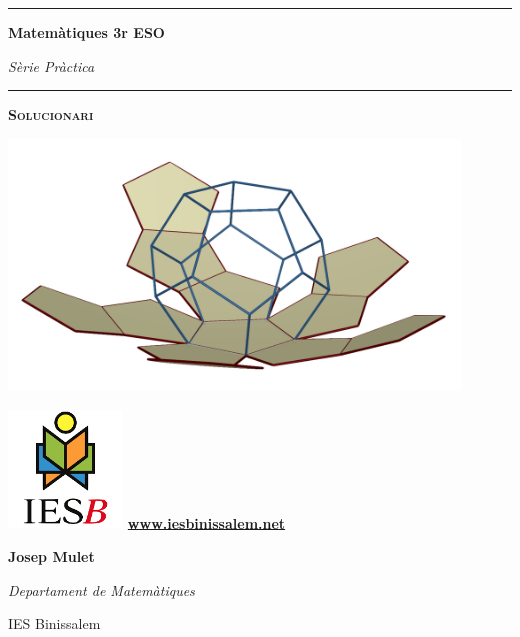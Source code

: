 \documentclass[a4paper, pdf, twoside]{book}
\begin{document}
\thispagestyle{empty}
\pagestyle{plain}
\renewcommand{\headrulewidth}{0pt}
\begin{center}
\vspace*{0.5cm}\hrule\vspace{0.5cm}
\Huge \textbf{Matemàtiques 3r ESO} \par
\large \textit{Sèrie Pràctica}\par
\vspace{0.5cm}\hrule\vspace{0.5cm}
\Huge \textbf{\textsc{Solucionari}} \par \vspace{1.5cm}
	\includegraphics[width=0.9\textwidth]{img-00/portada}   

	\vspace{1.5cm}  
	\begin{minipage}{0.4\textwidth}  
		\begin{center}  
			\includegraphics*[width=1.2in]{img-00/ies-binissalem-logo}  
			\small  
			\noindent \href{www.iesbinissalem.net}{\textbf{www.iesbinissalem.net}}  
		\end{center}  
	\end{minipage}  
	\begin{minipage}{0.4\textwidth}  
		\begin{flushright}  
			\normalsize \textbf{Josep Mulet}\par 
			\textit{Departament de Matemàtiques}\par   
			IES Binissalem  
		\end{flushright}  
	\end{minipage}   
	\end{center}   
\end{document}
